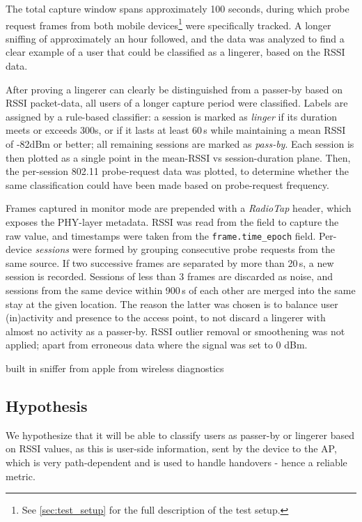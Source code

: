 \documentclass[twocolumn]{article}
\begin{document}
The total capture window spans approximately 100 seconds, during which probe request frames from both mobile devices\footnote{See \autoref{sec:test_setup} for the full description of the test setup.} were specifically tracked. A longer sniffing of approximately an hour followed, and the data was analyzed to find a clear example of a user that could be classified as a lingerer, based on the RSSI data.

After proving a lingerer can clearly be distinguished from a passer-by based on RSSI packet-data, all users of a longer capture period were classified. Labels are assigned by a rule-based classifier: a session is marked as \emph{linger} if its duration meets or exceeds 300s, or if it lasts at least 60\,s while maintaining a mean RSSI of -82dBm or better; all remaining sessions are marked as \emph{pass-by}. Each session is then plotted as a single point in the mean-RSSI vs session-duration plane. Then, the per-session 802.11 probe-request data was plotted, to determine whether the same classification could have been made based on probe-request frequency.

Frames captured in monitor mode are prepended with a \emph{RadioTap} header, which exposes the PHY-layer metadata. RSSI was read from the \texttt{} field to capture the raw value, and timestamps were taken from the \texttt{frame.time\_epoch} field. Per-device \emph{sessions} were formed by grouping consecutive probe requests from the same source. If two successive frames are separated by more than 20\,s, a new session is recorded. Sessions of less than 3 frames are discarded as noise, and sessions from the same device within 900\,s of each other are merged into the same stay at the given location. The reason the latter was chosen is to balance user (in)activity and presence to the access point, to not discard a lingerer with almost no activity as a passer-by. RSSI outlier removal or smoothening was not applied; apart from erroneous data where the signal was set to 0 dBm.


built in sniffer from apple from wireless diagnostics

\subsection{Hypothesis}
\label{subsec:hyp}

We hypothesize that it will be able to classify users as passer-by or lingerer based on RSSI values, as this is user-side information, sent by the device to the AP, which is very path-dependent and is used to handle handovers - hence a reliable metric.
\end{document}
